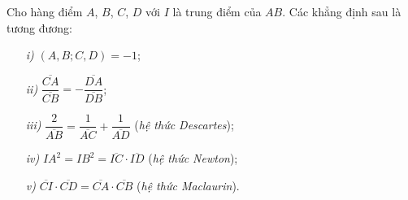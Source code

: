 \documentclass{article} %
\begin{document}
        \begin{theorem}
            Cho hàng điểm \(A\), \(B\), \(C\), \(D\) với \(I\) là trung điểm của \(AB\). Các khẳng định sau là tương đương:
            \vspace{-0.25cm}
            \begin{multicols}{2}
                \begin{enumerate}
                    \itemsep 0.25cm
                    \item[\textit{i)}] \((A,B;C,D) = -1\);
                    \item[\textit{ii)}] \(\dfrac{\overline{CA}}{\overline{CB}} = -\dfrac{\overline{DA}}{\overline{DB}}\);
                    \item[\textit{iii)}] \(\dfrac{2}{\overline{AB}} = \dfrac{1}{\overline{AC}} + \dfrac{1}{\overline{AD}}\) (\textit{hệ thức Descartes});
                \end{enumerate}
        
                \columnbreak
                
                \begin{enumerate}
                    \itemsep 0.25cm
                    \item[\textit{iv)}] \(IA^2 = IB^2 = \overline{IC} \cdot \overline{ID}\) (\textit{hệ thức Newton});
                    \item[\textit{v)}] \(\overline{CI} \cdot \overline{CD} = \overline{CA} \cdot \overline{CB}\) (\textit{hệ thức Maclaurin}).
                \end{enumerate}
            \end{multicols}
        \end{theorem}
\end{document}
